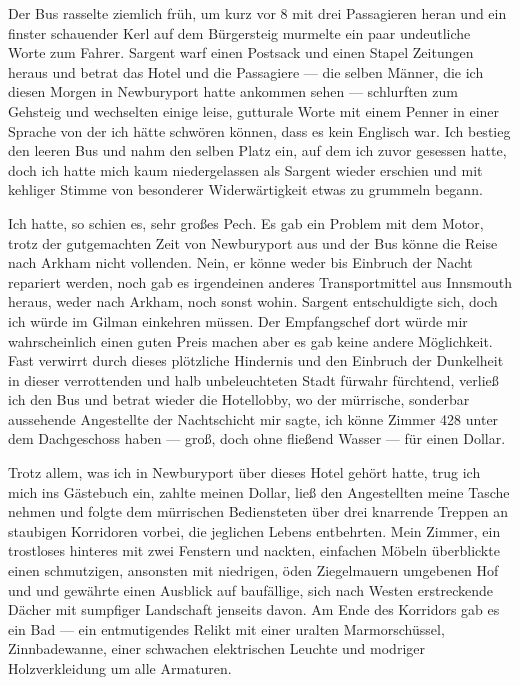 Der Bus rasselte ziemlich früh, um kurz vor 8 mit drei Passagieren heran und ein finster schauender Kerl auf dem Bürgersteig murmelte ein paar undeutliche Worte zum Fahrer. Sargent warf einen Postsack und einen Stapel Zeitungen heraus und betrat das Hotel und die Passagiere --- die selben Männer, die ich diesen Morgen in Newburyport hatte ankommen sehen --- schlurften zum Gehsteig und wechselten einige leise, gutturale Worte mit einem Penner in einer Sprache von der ich hätte schwören können, dass es kein Englisch war. Ich bestieg den leeren Bus und nahm den selben Platz ein, auf dem ich zuvor gesessen hatte, doch ich hatte mich kaum niedergelassen als Sargent wieder erschien und mit kehliger Stimme von besonderer Widerwärtigkeit etwas zu grummeln begann.

Ich hatte, so schien es, sehr großes Pech. Es gab ein Problem mit dem Motor, trotz der gutgemachten Zeit von Newburyport aus und der Bus könne die Reise nach Arkham nicht vollenden. Nein, er könne weder bis Einbruch der Nacht repariert werden, noch gab es irgendeinen anderes Transportmittel aus Innsmouth heraus, weder nach Arkham, noch sonst wohin. Sargent entschuldigte sich, doch ich würde im Gilman einkehren müssen. Der Empfangschef dort würde mir wahrscheinlich einen guten Preis machen aber es gab keine andere Möglichkeit. Fast verwirrt durch dieses plötzliche Hindernis und den Einbruch der Dunkelheit in dieser verrottenden und halb unbeleuchteten Stadt fürwahr fürchtend, verließ ich den Bus und betrat wieder die Hotellobby, wo der mürrische, sonderbar aussehende Angestellte der Nachtschicht mir sagte, ich könne Zimmer 428 unter dem Dachgeschoss haben --- groß, doch ohne fließend Wasser --- für einen Dollar.

Trotz allem, was ich in Newburyport über dieses Hotel gehört hatte, trug ich mich ins Gästebuch ein, zahlte meinen Dollar, ließ den Angestellten meine Tasche nehmen und folgte dem mürrischen Bediensteten über drei knarrende Treppen an staubigen Korridoren vorbei, die jeglichen Lebens entbehrten. Mein Zimmer, ein trostloses hinteres mit zwei Fenstern und nackten, einfachen Möbeln überblickte einen schmutzigen, ansonsten mit niedrigen, öden Ziegelmauern umgebenen Hof und und gewährte einen Ausblick auf baufällige, sich nach Westen erstreckende Dächer mit sumpfiger Landschaft jenseits davon. Am Ende des Korridors gab es ein Bad --- ein entmutigendes Relikt mit einer uralten Marmorschüssel, Zinnbadewanne, einer schwachen elektrischen Leuchte und modriger Holzverkleidung um alle Armaturen.

